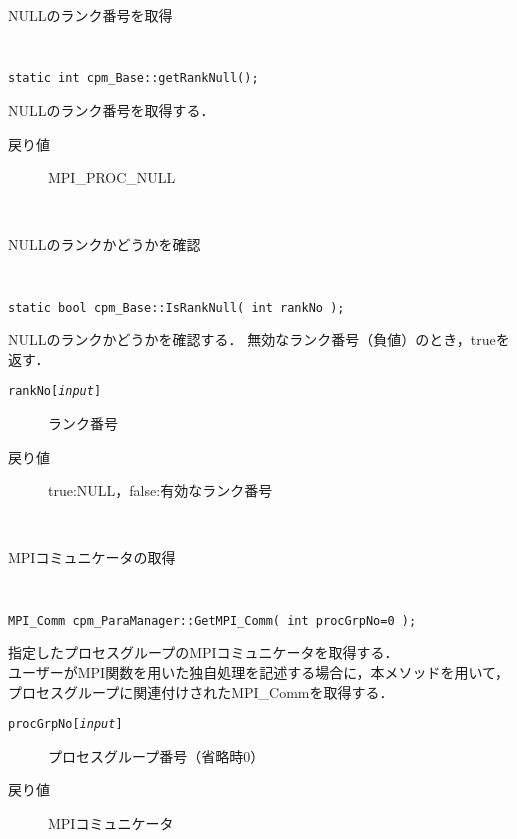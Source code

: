 \begin{spacing}{0.8}
\begin{itembox}[l]{NULLのランク番号を取得}
{\tt
\begin{verbatim}
static int cpm_Base::getRankNull();
\end{verbatim}
}
NULLのランク番号を取得する．
\begin{description}
\item[戻り値] MPI\_PROC\_NULL
\end{description}
\end{itembox}\\
\end{spacing}

\begin{spacing}{0.8}
\begin{itembox}[l]{NULLのランクかどうかを確認}
{\tt
\begin{verbatim}
static bool cpm_Base::IsRankNull( int rankNo );
\end{verbatim}
}
NULLのランクかどうかを確認する．
無効なランク番号（負値）のとき，trueを返す．
\begin{description}
\item[{\tt rankNo[{\it input}]}] ランク番号
\\
\item[戻り値] true:NULL，false:有効なランク番号
\end{description}
\end{itembox}\\
\end{spacing}

\begin{spacing}{0.8}
\begin{itembox}[l]{MPIコミュニケータの取得}
{\tt
\begin{verbatim}
MPI_Comm cpm_ParaManager::GetMPI_Comm( int procGrpNo=0 );
\end{verbatim}
}
指定したプロセスグループのMPIコミュニケータを取得する．\\
ユーザーがMPI関数を用いた独自処理を記述する場合に，本メソッドを用いて，
プロセスグループに関連付けされたMPI\_Commを取得する．
\begin{description}
\item[{\tt procGrpNo[{\it input}]}] プロセスグループ番号（省略時0）
\\
\item[戻り値] MPIコミュニケータ
\end{description}
\end{itembox}\\
\end{spacing}

